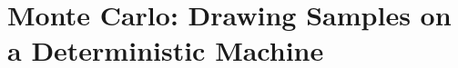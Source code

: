 \chapter{Monte Carlo: Drawing Samples on a Deterministic Machine}\label{ch:06}

\providecommand{\SixAMontyN}{}\renewcommand{\SixAMontyN}{300{,}000}
\providecommand{\SixAMontyGoodLikA}{}\renewcommand{\SixAMontyGoodLikA}{0.500}
\providecommand{\SixAMontyGoodLikB}{}\renewcommand{\SixAMontyGoodLikB}{1.000}
\providecommand{\SixAMontyGoodPostA}{}\renewcommand{\SixAMontyGoodPostA}{0.333}
\providecommand{\SixAMontyGoodPostB}{}\renewcommand{\SixAMontyGoodPostB}{0.667}
\providecommand{\SixAMontyBadOneLikA}{}\renewcommand{\SixAMontyBadOneLikA}{0.000}
\providecommand{\SixAMontyBadOnePostA}{}\renewcommand{\SixAMontyBadOnePostA}{0.000}
\providecommand{\SixAMontyBadOnePostB}{}\renewcommand{\SixAMontyBadOnePostB}{1.000}
\providecommand{\SixAMontyBadTwoLikA}{}\renewcommand{\SixAMontyBadTwoLikA}{1.000}
\providecommand{\SixAMontyBadTwoPostB}{}\renewcommand{\SixAMontyBadTwoPostB}{0.501}
\providecommand{\SixAMontyGoodSwitch}{}\renewcommand{\SixAMontyGoodSwitch}{0.667}
\providecommand{\SixAMontyBadOneSwitch}{}\renewcommand{\SixAMontyBadOneSwitch}{0.667}
\providecommand{\SixAMontyBadTwoSwitch}{}\renewcommand{\SixAMontyBadTwoSwitch}{0.667}
\providecommand{\SixAPiLcgEst}{}\renewcommand{\SixAPiLcgEst}{3.0899}
\providecommand{\SixAPiLcgSe}{}\renewcommand{\SixAPiLcgSe}{0.0017}
\providecommand{\SixAPiLcgErr}{}\renewcommand{\SixAPiLcgErr}{-0.0517}
\providecommand{\SixAPiPcgEst}{}\renewcommand{\SixAPiPcgEst}{3.1389}
\providecommand{\SixAPiPcgSe}{}\renewcommand{\SixAPiPcgSe}{0.0016}
\providecommand{\SixAPiPcgErr}{}\renewcommand{\SixAPiPcgErr}{-0.0027}
\providecommand{\SixAMidSqMaxSteps}{}\renewcommand{\SixAMidSqMaxSteps}{111}
\providecommand{\SixAMidSqMeanSteps}{}\renewcommand{\SixAMidSqMeanSteps}{43.7}
\providecommand{\SixAMidSqZero}{}\renewcommand{\SixAMidSqZero}{1968}
\providecommand{\SixAMidSqZeroPct}{}\renewcommand{\SixAMidSqZeroPct}{20}
\providecommand{\SixALamAPeriod}{}\renewcommand{\SixALamAPeriod}{2048}
\providecommand{\SixALamBPeriod}{}\renewcommand{\SixALamBPeriod}{244944}
\providecommand{\SixABitPerZero}{}\renewcommand{\SixABitPerZero}{2}
\providecommand{\SixABitPerOne}{}\renewcommand{\SixABitPerOne}{4}
\providecommand{\SixABitPerTwo}{}\renewcommand{\SixABitPerTwo}{8}
\providecommand{\SixABitPerThree}{}\renewcommand{\SixABitPerThree}{16}
\providecommand{\SixABitPerEleven}{}\renewcommand{\SixABitPerEleven}{4096}
\providecommand{\SixARanduNplanes}{}\renewcommand{\SixARanduNplanes}{15}
